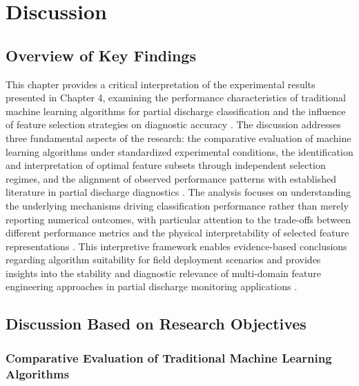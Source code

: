 \chapter{Discussion}

\section{Overview of Key Findings}

This chapter provides a critical interpretation of the experimental results presented in Chapter 4, examining the performance characteristics of traditional machine learning algorithms for partial discharge classification and the influence of feature selection strategies on diagnostic accuracy \parencite{Aldosari_2023, Govindarajan_2023_1}. The discussion addresses three fundamental aspects of the research: the comparative evaluation of machine learning algorithms under standardized experimental conditions, the identification and interpretation of optimal feature subsets through independent selection regimes, and the alignment of observed performance patterns with established literature in partial discharge diagnostics \parencite{Srivastava_2023_1, Zemouri_2023_1}. The analysis focuses on understanding the underlying mechanisms driving classification performance rather than merely reporting numerical outcomes, with particular attention to the trade-offs between different performance metrics and the physical interpretability of selected feature representations \parencite{Seitz_2024_1, Zhang_2024_29}. This interpretive framework enables evidence-based conclusions regarding algorithm suitability for field deployment scenarios and provides insights into the stability and diagnostic relevance of multi-domain feature engineering approaches in partial discharge monitoring applications \parencite{Long_2024, Florkowski_2024}.

\section{Discussion Based on Research Objectives}

\subsection{Comparative Evaluation of Traditional Machine Learning Algorithms}

